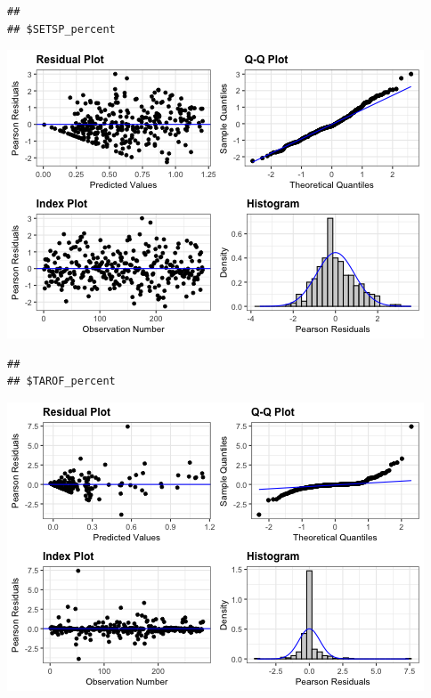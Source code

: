 \documentclass[
]{article}
\begin{document}
\begin{verbatim}
## 
## $SETSP_percent
\end{verbatim}

\includegraphics{Individual-sp-difference_files/figure-latex/unnamed-chunk-15-5.png}

\begin{verbatim}
## 
## $TAROF_percent
\end{verbatim}

\includegraphics{Individual-sp-difference_files/figure-latex/unnamed-chunk-15-6.png}
\end{document}
